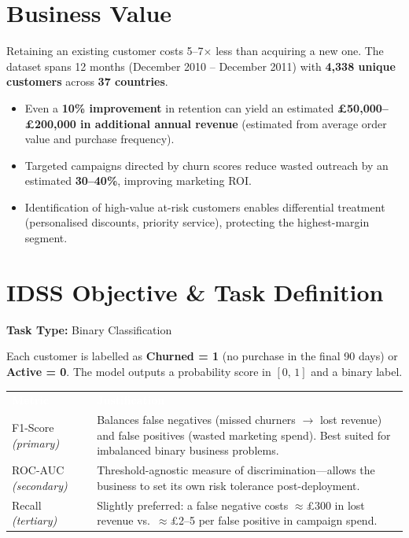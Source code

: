 \documentclass[12pt, a4paper]{article}
\newcommand{\thead}[1]{\textcolor{white}{\textbf{#1}}}
\begin{document}
\section{Business Value}

Retaining an existing customer costs 5--7$\times$ less than acquiring a new one.
The dataset spans 12 months (December 2010 -- December 2011) with \textbf{4,338 unique
customers} across \textbf{37 countries}.

\begin{itemize}
    \item Even a \textbf{10\% improvement} in retention can yield an estimated
          \textbf{\pounds 50,000--\pounds 200,000 in additional annual revenue}
          (estimated from average order value and purchase frequency).
    \item Targeted campaigns directed by churn scores reduce wasted outreach by an estimated
          \textbf{30--40\%}, improving marketing ROI.
    \item Identification of high-value at-risk customers enables differential treatment
          (personalised discounts, priority service), protecting the highest-margin segment.
\end{itemize}

\section{IDSS Objective \& Task Definition}

\textbf{Task Type:} Binary Classification

Each customer is labelled as \textbf{Churned = 1} (no purchase in the final 90 days) or
\textbf{Active = 0}. The model outputs a probability score in $[0,\,1]$ and a binary label.

\vspace{6pt}
\renewcommand{\arraystretch}{1.2}
\begin{tabularx}{\linewidth}{L{3.8cm} Y}
\thead{Metric} & \thead{Justification} \\
F1-Score \emph{(primary)} &
  Balances false negatives (missed churners $\to$ lost revenue) and false positives (wasted
  marketing spend). Best suited for imbalanced binary business problems. \\
ROC-AUC \emph{(secondary)} &
  Threshold-agnostic measure of discrimination---allows the business to set its own
  risk tolerance post-deployment. \\
Recall \emph{(tertiary)} &
  Slightly preferred: a false negative costs $\approx$\pounds 300 in lost revenue vs.\
  $\approx$\pounds 2--5 per false positive in campaign spend. \\
\end{tabularx}
\end{document}
